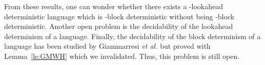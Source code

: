 \documentclass{llncs}
\begin{document}
From these results, one can wonder whether there exists a -lookahead deterministic language which is -block deterministic without being -block deterministic.
Another open problem is the decidability of the lookahead determinism of a language.
Finally, the decidability of the block determinism of a language has been studied by Giammarresi \emph{et al.} but proved with Lemma~\ref{le:GMWH} which we invalidated.
Thus, this problem is still open.



\end{document}
